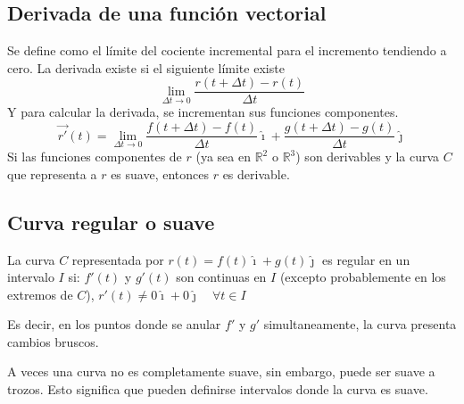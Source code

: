 \subsection{Derivada de una función vectorial}

Se define como el límite del cociente incremental para el incremento tendiendo a cero. La derivada existe si el siguiente límite existe
$$
\lim_{\Delta t \to 0} \frac{r(t+\Delta t)- r(t)}{\Delta t}
$$
Y para calcular la derivada, se incrementan sus funciones componentes.
$$
\vec{r'} (t) = \lim_{\Delta t \to 0} \frac{f(t+\Delta t)- f(t)}{\Delta t}\hat{\imath} + \frac{g(t+\Delta t)- g(t)}{\Delta t}\hat{\jmath}
$$
Si las funciones componentes de $r$ (ya sea en $\mathbb{R}^2$ o $\mathbb{R}^3$) son derivables y la curva $C$ que representa a $r$ es suave, entonces $r$ es derivable.

\subsection{Curva regular o suave}

La curva $C$ representada por $r(t)=f(t)\hat{\imath} + g(t)\hat{\jmath}$ es regular en un intervalo $I$ si: $f'(t)$ y $g'(t)$ son continuas en $I$ (excepto  probablemente en los extremos de $C$), $r'(t)\neq 0\hat{\imath} + 0 \hat{\jmath} \quad \forall t \in I$

Es decir, en los puntos donde se anular $f'$ y $g'$ simultaneamente, la curva presenta cambios bruscos.

A veces una curva no es completamente suave, sin embargo, puede ser suave a trozos. Esto significa que pueden definirse intervalos donde la curva es suave.
